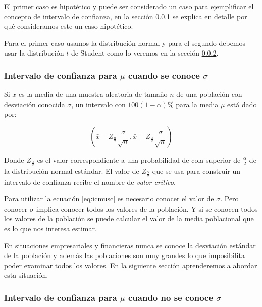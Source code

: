 \documentclass[
]{krantz}
\begin{document}
El primer caso es hipotético y puede ser considerado un caso para ejemplificar el concepto de intervalo de confianza, en la sección \ref{jt} se explica en detalle por qué consideramos este un caso hipotético.

Para el primer caso usamos la distribución normal y para el segundo debemos usar la distribución \(t\) de Student como lo veremos en la sección \ref{icsd}.

\hypertarget{jt}{%
\subsubsection{\texorpdfstring{Intervalo de confianza para \(\mu\) cuando se conoce \(\sigma\)}{Intervalo de confianza para \textbackslash{}mu cuando se conoce \textbackslash{}sigma}}\label{jt}}

Si \(\bar{x}\) es la media de una muestra aleatoria de tamaño \(n\) de una población con desviación conocida \(\sigma\), un intervalo con \(100\left(1-\alpha\right)\%\) para la media \(\mu\) está dado por:

\begin{equation} 
  \left(\bar{x} - Z_{\frac{\alpha}{2}}\dfrac{\sigma}{\sqrt{n}}, \bar{x} + Z_{\frac{\alpha}{2}}\dfrac{\sigma}{\sqrt{n}}  \right)
  \label{eq:icmusc}
\end{equation}

Donde \(Z_{\frac{\alpha}{2}}\) es el valor correspondiente a una probabilidad de cola superior de \(\frac{\alpha}{2}\) de la distribución normal estándar. El valor de \(Z_{\frac{\alpha}{2}}\) que se usa para construir un intervalo de confianza recibe el nombre de \emph{valor crítico}.

Para utilizar la ecuación \eqref{eq:icmusc} es necesario conocer el valor de \(\sigma\). Pero conocer \(\sigma\) implica conocer todos los valores de la población. Y si se conocen todos los valores de la población se puede calcular el valor de la media poblacional que es lo que nos interesa estimar.

En situaciones empresariales y financieras nunca se conoce la desviación estándar de la población y además las poblaciones son muy grandes lo que imposibilita poder examinar todos los valores. En la siguiente sección aprenderemos a abordar esta situación.

\hypertarget{icsd}{%
\subsubsection{\texorpdfstring{Intervalo de confianza para \(\mu\) cuando no se conoce \(\sigma\)}{Intervalo de confianza para \textbackslash{}mu cuando no se conoce \textbackslash{}sigma}}\label{icsd}}
\end{document}
